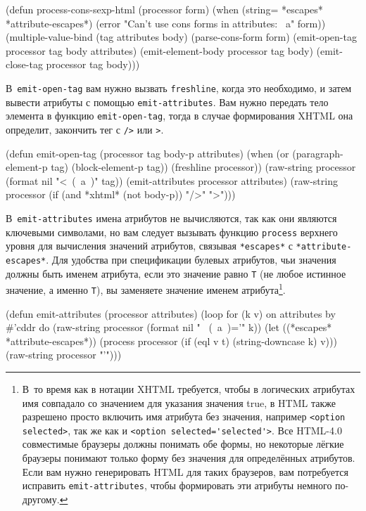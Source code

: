 \begin{myverb}
(defun process-cons-sexp-html (processor form)
  (when (string= *escapes* *attribute-escapes*)
    (error "Can't use cons forms in attributes: ~a" form))
  (multiple-value-bind (tag attributes body) (parse-cons-form form)
    (emit-open-tag     processor tag body attributes)
    (emit-element-body processor tag body)
    (emit-close-tag    processor tag body)))
\end{myverb}

В~\lstinline{emit-open-tag} вам нужно вызвать \lstinline{freshline}, когда это необходимо, и затем
вывести атрибуты с помощью \lstinline{emit-attributes}. Вам нужно передать тело элемента в
функцию \lstinline{emit-open-tag}, тогда в случае формирования XHTML она определит, закончить
тег с \lstinline{/>} или \lstinline{>}.

\begin{myverb}
(defun emit-open-tag (processor tag body-p attributes)
  (when (or (paragraph-element-p tag) (block-element-p tag))
    (freshline processor))
  (raw-string processor (format nil "<~(~a~)" tag))
  (emit-attributes processor attributes)
  (raw-string processor (if (and *xhtml* (not body-p)) "/>" ">")))
\end{myverb}

В~\lstinline{emit-attributes} имена атрибутов не вычисляются, так как они являются
ключевыми символами, но вам следует вызывать функцию \lstinline{process} верхнего уровня
для вычисления значений атрибутов, связывая \lstinline{*escapes*} с
\lstinline{*attribute-escapes*}. Для удобства при спецификации булевых атрибутов, чьи
значения должны быть именем атрибута, если это значение равно \lstinline{Т} (не любое
истинное значение, а именно \lstinline{Т}), вы заменяете значение именем
атрибута\footnote{В~то время как в нотации XHTML требуется, чтобы в логических атрибутах
  имя совпадало со значением для указания значения true, в HTML также разрешено просто
  включить имя атрибута без значения, например \lstinline{<option selected>}, так же как и
  \lstinline{<option selected='selected'>}. Все HTML-4.0 совместимые браузеры должны
  понимать обе формы, но некоторые лёгкие браузеры понимают только форму без значения для
  определённых атрибутов. Если вам нужно генерировать HTML для таких браузеров, вам
  потребуется исправить \lstinline{emit-attributes}, чтобы формировать эти атрибуты
  немного по-другому.}.

\begin{myverb}
(defun emit-attributes (processor attributes)
  (loop for (k v) on attributes by #'cddr do
       (raw-string processor (format nil " ~(~a~)='" k))
       (let ((*escapes* *attribute-escapes*))
         (process processor (if (eql v t) (string-downcase k) v)))
       (raw-string processor "'")))
\end{myverb}

